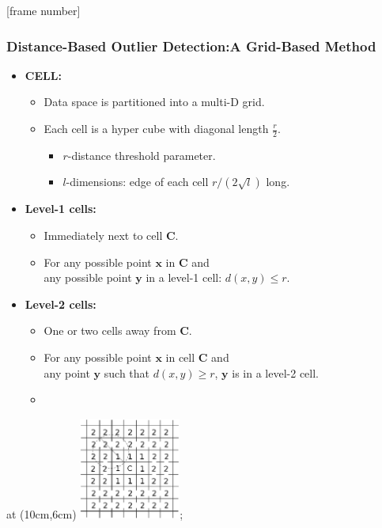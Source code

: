 \documentclass[aspectratio=169,t,xcolor=dvipsnames]{beamer}
\begin{document}
{
  [frame number]
  \begin{frame}
  	\frametitle{Distance-Based Outlier Detection:A Grid-Based Method}
  	\begin{itemize}
  		\item \textbf{CELL:}
  		      \begin{itemize}
  		      	\item Data space is partitioned into a multi-D grid.
  		      	\item Each cell is a hyper cube with diagonal length $\frac{r}{2}$.
  		      	      \begin{itemize}
  		      	      	\item $r$-distance threshold parameter.
  		      	      	\item $l$-dimensions: edge of each cell $r / (2\sqrt{l})$ long.
  		      	      \end{itemize}
  		      \end{itemize}
  		\item \textbf{Level-1 cells:}
  		      \begin{itemize}
  		      	\item Immediately next to cell $\mathbf{C}$.
  		      	\item For any possible point $\mathbf{x}$ in $\mathbf{C}$ and \\
              any possible point $\mathbf{y}$ in a level-1 cell: $d(x,y) \leq r$.
  		      \end{itemize}
  		\item \textbf{Level-2 cells:}
  		      \begin{itemize}
  		      	\item One or two cells away from $\mathbf{C}$.
  		      	\item For any possible point $\mathbf{x}$ in cell $\mathbf{C}$ and \\
              any point $\mathbf{y}$ such that $d(x,y) \geq r$, $\mathbf{y}$ is in a level-2 cell.
  		      	\item
  		      \end{itemize}
  	\end{itemize}
  	\tikzoverlay at (10cm,6cm) {\includegraphics[width=0.25\textwidth]{img/grid8.png}};
  \end{frame}
}
\end{document}
